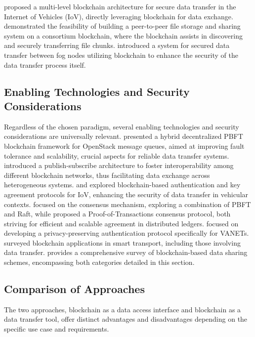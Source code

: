 \documentclass[10pt]{llncs}
\begin{document}
\cite{Lin2023} proposed a multi-level blockchain architecture for secure data transfer in the Internet of Vehicles (IoV), directly leveraging blockchain for data exchange. \cite{Peng2023} demonstrated the feasibility of building a peer-to-peer file storage and sharing system on a consortium blockchain, where the blockchain assists in discovering and securely transferring file chunks. \cite{Priyadarshini2021} introduced a system for secured data transfer between fog nodes utilizing blockchain to enhance the security of the data transfer process itself.

\subsection{Enabling Technologies and Security Considerations}

Regardless of the chosen paradigm, several enabling technologies and security considerations are universally relevant.
\cite{kim2020hybrid} presented a hybrid decentralized PBFT blockchain framework for OpenStack message queues, aimed at improving fault tolerance and scalability, 
crucial aspects for reliable data transfer systems. 
\cite{Ghaemi2021} introduced a publish-subscribe architecture to foster interoperability among different blockchain networks, thus facilitating data exchange across heterogeneous systems. 
\cite{Bagga2021} and \cite{Xu2021} explored blockchain-based authentication and key agreement protocols for IoV, enhancing the security of data transfer in vehicular contexts. 
\cite{Bogdanov2024} focused on the consensus mechanism, exploring a combination of PBFT and Raft, while \cite{Ai2022} proposed a Proof-of-Transactions consensus protocol, 
both striving for efficient and scalable agreement in distributed ledgers. \cite{Lin2020} focused on developing a privacy-preserving authentication protocol specifically for VANETs. 
\cite{Bagga2022} surveyed blockchain applications in smart transport, including those involving data transfer. 
\cite{Song2023} provides a comprehensive survey of blockchain-based data sharing schemes, encompassing both categories detailed in this section.

\subsection{Comparison of Approaches}

The two approaches, blockchain as a data access interface and blockchain as a data transfer tool, offer distinct advantages and disadvantages depending on the specific use case and requirements.
\end{document}
